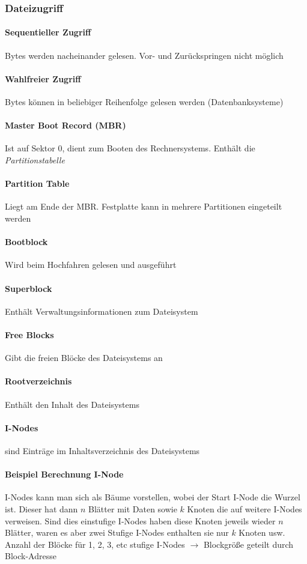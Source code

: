 \documentclass[11pt,a4paper,landscape]{article}
\begin{document}
\begin{multicols*}{3}
	\subsubsection{Dateizugriff}
	\paragraph{Sequentieller Zugriff} Bytes werden nacheinander gelesen. Vor- und Zurückspringen nicht möglich
	\paragraph{Wahlfreier Zugriff} Bytes können in beliebiger Reihenfolge gelesen werden (Datenbanksysteme)
	\paragraph{Master Boot Record (MBR)} Ist auf Sektor 0, dient zum Booten des Rechnersystems. Enthält die \textit{Partitionstabelle}
	\paragraph{Partition Table} Liegt am Ende der MBR. Festplatte kann in mehrere Partitionen eingeteilt werden
	\paragraph{Bootblock} Wird beim Hochfahren gelesen und ausgeführt
	\paragraph{Superblock} Enthält Verwaltungsinformationen zum Dateisystem
	\paragraph{Free Blocks} Gibt die freien Blöcke des Dateisystems an
	\paragraph{Rootverzeichnis} Enthält den Inhalt des Dateisystems
	\paragraph{I-Nodes} sind Einträge im Inhaltsverzeichnis des Dateisystems
	\paragraph{Beispiel Berechnung I-Node} I-Nodes kann man sich als Bäume vorstellen, wobei der Start I-Node die Wurzel ist. Dieser hat dann $n$ Blätter mit Daten sowie $k$ Knoten die auf weitere I-Nodes verweisen. Sind dies einstufige I-Nodes haben diese Knoten jeweils wieder $n$ Blätter, waren es aber zwei Stufige I-Nodes enthalten sie nur $k$ Knoten usw. Anzahl der Blöcke für 1, 2, 3, etc stufige I-Nodes $\rightarrow$ Blockgröße geteilt durch Block-Adresse

\end{multicols*}
\end{document}
